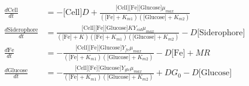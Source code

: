 \begin{align}\frac{d\text{Cell}}{dt} &=- \text{[Cell]}  D + \frac{\text{[Cell]}  \text{[Fe]}  \text{[Glucose]}  \mu_{max}}{\left(\text{[Fe]}  + K_{m1}\right) \left(\text{[Glucose]}  + K_{m2}\right)}\\
\frac{d\text{Siderophore}}{dt} &=\frac{\text{[Cell]}  \text{[Fe]}  \text{[Glucose]}  K Y_{sid} \mu_{max}}{\left(\text{[Fe]}  + K\right) \left(\text{[Fe]}  + K_{m1}\right) \left(\text{[Glucose]}  + K_{m2}\right)} - D \text{[Siderophore]} \\
\frac{d\text{Fe}}{dt} &=- \frac{\text{[Cell]}  \text{[Fe]}  \text{[Glucose]}  Y_{fe} \mu_{max}}{\left(\text{[Fe]}  + K_{m1}\right) \left(\text{[Glucose]}  + K_{m2}\right)} - D \text{[Fe]}  + M R\\
\frac{d\text{Glucose}}{dt} &=- \frac{\text{[Cell]}  \text{[Fe]}  \text{[Glucose]}  Y_{glc} \mu_{max}}{\left(\text{[Fe]}  + K_{m1}\right) \left(\text{[Glucose]}  + K_{m2}\right)} + D G_{0} - D \text{[Glucose]} 
\end{align}